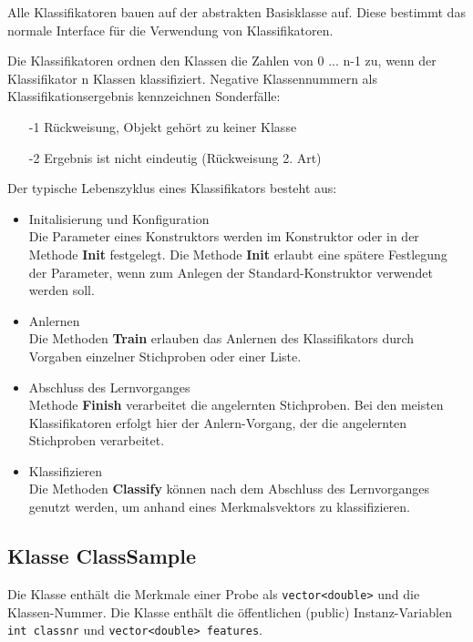 
Alle Klassifikatoren bauen auf der abstrakten Basisklasse 
 auf. Diese bestimmt das normale Interface
für die Verwendung von Klassifikatoren. 

Die Klassifikatoren ordnen den Klassen die Zahlen von 0 ... n-1 zu,
wenn der Klassifikator n Klassen klassifiziert. Negative Klassennummern
als Klassifikationsergebnis kennzeichnen Sonderfälle:
\begin{itemize}
\item[-1] Rückweisung, Objekt gehört zu keiner Klasse
\item[-2] Ergebnis ist nicht eindeutig (Rückweisung 2. Art)
\end{itemize}

Der typische Lebenszyklus eines Klassifikators besteht aus:
\begin{itemize}
\item Initalisierung und Konfiguration\\
Die Parameter eines Konstruktors werden im Konstruktor
oder in der Methode {\bf Init} festgelegt. Die 
Methode {\bf Init} erlaubt eine spätere Festlegung der 
Parameter, wenn zum Anlegen der Standard-Konstruktor 
verwendet werden soll.
\item Anlernen\\
Die Methoden {\bf Train} erlauben das Anlernen des Klassifikators
durch Vorgaben einzelner Stichproben oder einer Liste.
\item Abschluss des Lernvorganges\\
Methode {\bf Finish} verarbeitet die angelernten Stichproben. Bei 
den meisten Klassifikatoren erfolgt hier der Anlern-Vorgang, der 
die angelernten Stichproben verarbeitet.
\item Klassifizieren\\
Die Methoden {\bf Classify} können nach dem Abschluss des Lernvorganges
genutzt werden, um anhand eines Merkmalsvektors zu klassifizieren. 
\end{itemize}

\subsection{Klasse ClassSample}
Die Klasse  enthält die Merkmale einer Probe als 
\verb+vector<double>+ und die Klassen-Nummer. Die Klasse enthält die 
öffentlichen (public) Instanz-Variablen \verb+int classnr+ und 
\verb+vector<double> features+.

